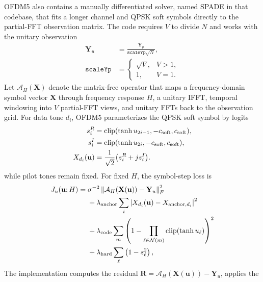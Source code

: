 \documentclass[journal]{IEEEtran}
\newcommand{\norm}[1]{\left\lVert #1 \right\rVert}
\newcommand{\abs}[1]{\left\lvert #1 \right\rvert}
\begin{document}
OFDM5 also contains a manually differentiated solver, named SPADE in that
codebase, that fits a longer channel and QPSK soft symbols directly to the
partial-FFT observation matrix. The code requires \(V\) to divide \(N\) and works
with the unitary observation
\begin{equation}
\begin{aligned}
  \mathbf Y_u&=\frac{\mathbf Y_p}{\texttt{scaleYp}\sqrt N},\\
  \texttt{scaleYp}&=
  \begin{cases}
    \sqrt V, & V>1,\\
    1, & V=1.
  \end{cases}
\end{aligned}
  \label{eq:ofdm5-spade-yu}
\end{equation}
Let \(\mathcal A_H(\mathbf X)\) denote the
matrix-free operator that maps a frequency-domain symbol vector \(\mathbf X\)
through frequency response \(H\), a unitary IFFT, temporal windowing into
\(V\) partial-FFT views, and unitary FFTs back to the observation grid. For data
tone \(d_i\), OFDM5 parameterizes the QPSK soft symbol by logits
\begin{equation}
\begin{aligned}
  s^R_i&=\operatorname{clip}(\tanh u_{2i-1},-c_{\rm soft},c_{\rm soft}),\\
  s^I_i&=\operatorname{clip}(\tanh u_{2i},-c_{\rm soft},c_{\rm soft}),\\
  X_{d_i}(\mathbf u)
  &=\frac{1}{\sqrt2}\big(s^R_i+js^I_i\big).
\end{aligned}
  \label{eq:ofdm5-spade-soft-symbol}
\end{equation}
while pilot tones remain fixed. For fixed \(H\), the symbol-step loss is
\begin{equation}
\begin{aligned}
  J_u(\mathbf u;H)
  ={}&\sigma^{-2}\norm{\mathcal A_H(\mathbf X(\mathbf u))-\mathbf Y_u}_F^2\\
  &+\lambda_{\rm anchor}\sum_i
      \abs{X_{d_i}(\mathbf u)-X_{{\rm anchor},d_i}}^2\\
  &+\lambda_{\rm code}\sum_{m}
      \left(1-\prod_{\ell\in\mathcal N(m)}
      \operatorname{clip}(\tanh u_\ell)\right)^2\\
  &+\lambda_{\rm hard}\sum_\ell \left(1-s_\ell^2\right),
\end{aligned}
  \label{eq:ofdm5-spade-u-loss}
\end{equation}
The implementation computes the residual
\(\mathbf R=\mathcal A_H(\mathbf X(\mathbf u))-\mathbf Y_u\), applies the
\end{document}
